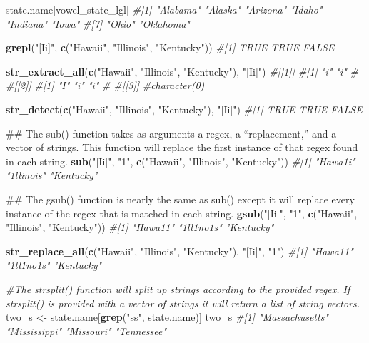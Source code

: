\documentclass[]{book}
\newenvironment{Shaded}{\begin{snugshade}}{\end{snugshade}}
\newcommand{\KeywordTok}[1]{\textcolor[rgb]{0.13,0.29,0.53}{\textbf{#1}}}
\newcommand{\StringTok}[1]{\textcolor[rgb]{0.31,0.60,0.02}{#1}}
\newcommand{\CommentTok}[1]{\textcolor[rgb]{0.56,0.35,0.01}{\textit{#1}}}
\newcommand{\NormalTok}[1]{#1}
\begin{document}
\begin{Shaded}
\begin{Highlighting}[]
\NormalTok{state.name[vowel_state_lgl]}
\CommentTok{#[1] "Alabama"  "Alaska"   "Arizona"  "Idaho"    "Indiana"  "Iowa"    }
\CommentTok{#[7] "Ohio"     "Oklahoma"}

\KeywordTok{grepl}\NormalTok{(}\StringTok{"[Ii]"}\NormalTok{, }\KeywordTok{c}\NormalTok{(}\StringTok{"Hawaii"}\NormalTok{, }\StringTok{"Illinois"}\NormalTok{, }\StringTok{"Kentucky"}\NormalTok{))}
\CommentTok{#[1]  TRUE  TRUE FALSE}

\KeywordTok{str_extract_all}\NormalTok{(}\KeywordTok{c}\NormalTok{(}\StringTok{"Hawaii"}\NormalTok{, }\StringTok{"Illinois"}\NormalTok{, }\StringTok{"Kentucky"}\NormalTok{), }\StringTok{"[Ii]"}\NormalTok{)}
\CommentTok{#[[1]]}
\CommentTok{#[1] "i" "i"}
\CommentTok{#}
\CommentTok{#[[2]]}
\CommentTok{#[1] "I" "i" "i"}
\CommentTok{#}
\CommentTok{#[[3]]}
\CommentTok{#character(0)}

\KeywordTok{str_detect}\NormalTok{(}\KeywordTok{c}\NormalTok{(}\StringTok{"Hawaii"}\NormalTok{, }\StringTok{"Illinois"}\NormalTok{, }\StringTok{"Kentucky"}\NormalTok{), }\StringTok{"[Ii]"}\NormalTok{)}
\CommentTok{#[1]  TRUE  TRUE FALSE}

\NormalTok{## The sub() function takes as arguments a regex, a “replacement,” and a vector of strings. This function will replace the first instance of that regex found in each string.}
\KeywordTok{sub}\NormalTok{(}\StringTok{"[Ii]"}\NormalTok{, }\StringTok{"1"}\NormalTok{, }\KeywordTok{c}\NormalTok{(}\StringTok{"Hawaii"}\NormalTok{, }\StringTok{"Illinois"}\NormalTok{, }\StringTok{"Kentucky"}\NormalTok{))}
\CommentTok{#[1] "Hawa1i"   "1llinois" "Kentucky"}

\NormalTok{## The gsub() function is nearly the same as sub() except it will replace every instance of the regex that is matched in each string.}
\KeywordTok{gsub}\NormalTok{(}\StringTok{"[Ii]"}\NormalTok{, }\StringTok{"1"}\NormalTok{, }\KeywordTok{c}\NormalTok{(}\StringTok{"Hawaii"}\NormalTok{, }\StringTok{"Illinois"}\NormalTok{, }\StringTok{"Kentucky"}\NormalTok{))}
\CommentTok{#[1] "Hawa11"   "1ll1no1s" "Kentucky"}

\KeywordTok{str_replace_all}\NormalTok{(}\KeywordTok{c}\NormalTok{(}\StringTok{"Hawaii"}\NormalTok{, }\StringTok{"Illinois"}\NormalTok{, }\StringTok{"Kentucky"}\NormalTok{), }\StringTok{"[Ii]"}\NormalTok{, }\StringTok{"1"}\NormalTok{)}
\CommentTok{#[1] "Hawa11"   "1ll1no1s" "Kentucky"}

\CommentTok{#The strsplit() function will split up strings according to the provided regex. If strsplit() is provided with a vector of strings it will return a list of string vectors.}
\NormalTok{two_s <-}\StringTok{ }\NormalTok{state.name[}\KeywordTok{grep}\NormalTok{(}\StringTok{"ss"}\NormalTok{, state.name)]}
\NormalTok{two_s}
\CommentTok{#[1] "Massachusetts" "Mississippi"   "Missouri"      "Tennessee"    }


\end{Highlighting}
\end{Shaded}
\end{document}
